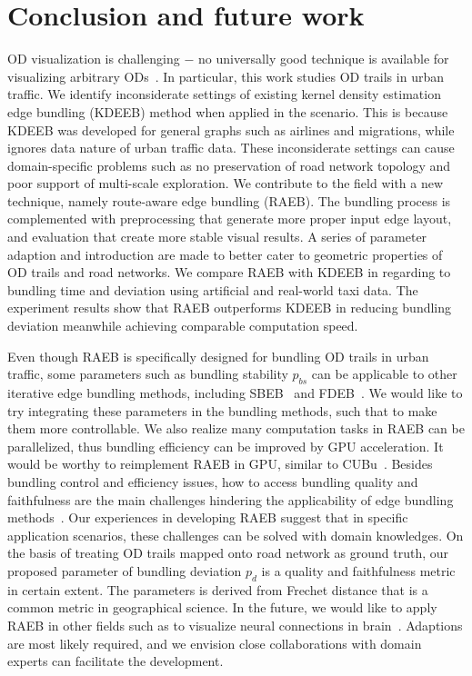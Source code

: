 \section{Conclusion and future work}
\label{sec:con}

OD visualization is challenging $-$ no universally good technique is available for visualizing arbitrary ODs~\cite{andrienko_visual_2012}.
In particular, this work studies OD trails in urban traffic.
We identify inconsiderate settings of existing kernel density estimation edge bundling (KDEEB) method when applied in the scenario.
This is because KDEEB was developed for general graphs such as airlines and migrations, while ignores data nature of urban traffic data.
These inconsiderate settings can cause domain-specific problems such as no preservation of road network topology and poor support of multi-scale exploration.
We contribute to the field with a new technique, namely route-aware edge bundling (RAEB). 
The bundling process is complemented with preprocessing that generate more proper input edge layout, and evaluation that create more stable visual results.
A series of parameter adaption and introduction are made to better cater to geometric properties of OD trails and road networks.
We compare RAEB with KDEEB in regarding to bundling time and deviation using artificial and real-world taxi data.
The experiment results show that RAEB outperforms KDEEB in reducing bundling deviation meanwhile achieving comparable computation speed.

Even though RAEB is specifically designed for bundling OD trails in urban traffic, some parameters such as bundling stability $p_{bs}$ can be applicable to other iterative edge bundling methods, including SBEB~\cite{ersoy2011skeleton} and FDEB~\cite{holten2009force}.
We would like to try integrating these parameters in the bundling methods, such that to make them more controllable.
We also realize many computation tasks in RAEB can be parallelized, thus bundling efficiency can be improved by GPU acceleration.
It would be worthy to reimplement RAEB in GPU, similar to CUBu~\cite{van2016cubu}.
Besides bundling control and efficiency issues, how to access bundling quality and faithfulness are the main challenges hindering the applicability of edge bundling methods~\cite{lhuillier2017state}.
Our experiences in developing RAEB suggest that in specific application scenarios, these challenges can be solved with domain knowledges.
On the basis of treating OD trails mapped onto road network as ground truth, our proposed parameter of bundling deviation $p_d$ is a quality and faithfulness metric in certain extent.
The parameters is derived from Frechet distance that is a common metric in geographical science.
In the future, we would like to apply RAEB in other fields such as to visualize neural connections in brain~\cite{2014_bottger_three-d, yang_2017_blockwise}.
Adaptions are most likely required, and we envision close collaborations with domain experts can facilitate the development.